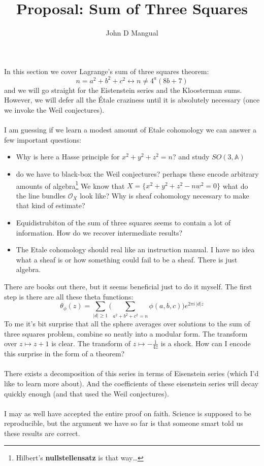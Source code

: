 \documentclass[12pt]{article}
\title{\textbf{Proposal: Sum of Three Squares}}
\author{John D Mangual}
\date{}
\begin{document}
\selectfont \fontsize{12.5}{15}\selectfont

\maketitle

\noindent In this section we cover Lagrange's sum of three squares theorem:
$$ n = a^2 + b^2 + c^2 \leftrightarrow n \neq 4^a(8b+7) $$
and we will go straight for the Eistenstein series and the Kloosterman sums.  However, we will defer all the \'{E}tale craziness until it is absolutely necessary (once we invoke the Weil conjectures).  \\ \\
I am guessing if we learn a modest amount of Etale cohomology we can answer a few important questions:
\begin{itemize}
\item Why is here a Hasse principle for $x^2 + y^2 + z^2= n$? and study $SO(3,\mathbb{A})$
\item do we have to black-box the Weil conjectures?  perhaps these encode arbitrary amounts of algebra\footnote{Hilbert's \textbf{nullstellensatz} is that way\dots} We know that $X = \{ x^2 + y^2 + z^2 - n w^2 = 0 \}$ what do the line bundles $\mathcal{O}_X$ look like?  Why is sheaf cohomology necessary to make that kind of estimate? 
\item Equidistrubiton of the sum of three squares seems to contain a lot of information.  How do we recover intermediate results?  
\item The Etale cohomology should real like an instruction manual.  I have no idea what a sheaf is or how something could fail to be a sheaf.  There is just algebra. 
\end{itemize}
There are books out there, but it seems beneficial just to do it myself.  The first step is there are all these theta functions:
$$ \theta_\phi(z) = \sum_{|d|\geq 1} \bigg( \sum_{a^2 + b^2 + c^2 = n}\phi(a,b,c) \bigg)e^{2\pi i \, |d|z} $$ 
To me it's bit surprise that all the sphere averages over solutions to the sum of three squares problem, combine so neatly into a modular form.  The transform over $z \mapsto z+1$ is clear.  The transform of $z \mapsto - \frac{1}{4z}$ is a shock.  How can I encode this surprise in the form of a theorem? \\ \\
There exists a decomposition of this series in terms of Eisenstein series (which I'd like to learn more about).  And the coefficients of these eisenstein series will decay quickly enough (and that used the Weil conjectures).  \\ \\
I may as well have accepted the entire proof on faith.  Science is supposed to be reproducible, but the argument we have so far is that someone smart told us these results are correct.
\end{document}
